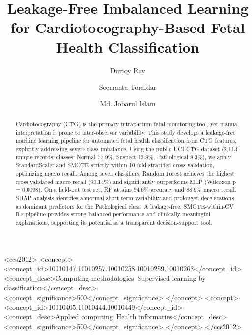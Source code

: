 \documentclass[sigconf]{acmart}
\begin{document}
\title{Leakage-Free Imbalanced Learning for Cardiotocography-Based Fetal Health Classification}

\author{Durjoy Roy}

\author{Seemanta Torafdar}

\author{Md. Jobarul Islam}

\begin{abstract}
Cardiotocography (CTG) is the primary intrapartum fetal monitoring tool, yet manual interpretation is prone to inter-observer variability. This study develops a leakage-free machine learning pipeline for automated fetal health classification from CTG features, explicitly addressing severe class imbalance. Using the public UCI CTG dataset (2,113 unique records; classes: Normal 77.9\%, Suspect 13.8\%, Pathological 8.3\%), we apply StandardScaler and SMOTE strictly within 10-fold stratified cross-validation, optimizing macro recall. Among seven classifiers, Random Forest achieves the highest cross-validated macro recall (90.14\%) and significantly outperforms MLP (Wilcoxon p = 0.0098). On a held-out test set, RF attains 94.6\% accuracy and 88.9\% macro recall. SHAP analysis identifies abnormal short-term variability and prolonged decelerations as dominant predictors for the Pathological class. A leakage-free, SMOTE-within-CV RF pipeline provides strong balanced performance and clinically meaningful explanations, supporting its potential as a transparent decision-support tool.
\end{abstract}

\begin{CCSXML}
<ccs2012>
   <concept>
       <concept_id>10010147.10010257.10010258.10010259.10010263</concept_id>
       <concept_desc>Computing methodologies~Supervised learning by classification</concept_desc>
       <concept_significance>500</concept_significance>
   </concept>
   <concept>
       <concept_id>10010405.10010444.10010449</concept_id>
       <concept_desc>Applied computing~Health informatics</concept_desc>
       <concept_significance>500</concept_significance>
   </concept>
</ccs2012>
\end{CCSXML}
\end{document}
